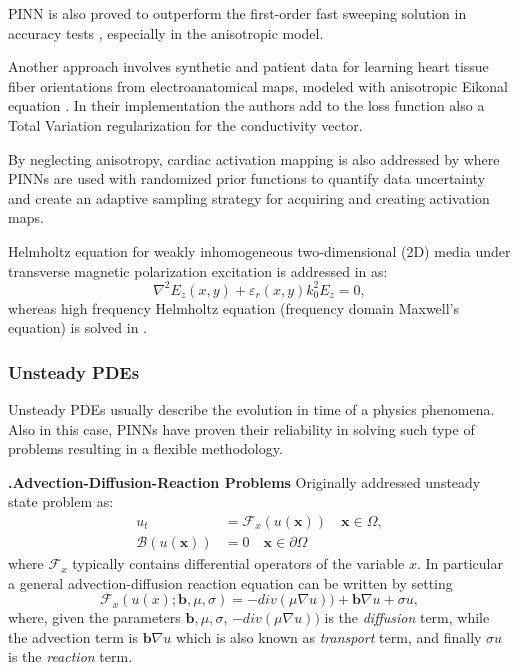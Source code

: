 \documentclass[pdflatex,sn-basic]{sn-jnl}%
\theoremstyle{thmstyleone}%
\theoremstyle{thmstyletwo}%
\theoremstyle{thmstylethree}%
\newcounter{paranum}[subsubsection]
\newcommand{\subsubsubsection}{\vspace{10pt}\noindent\textbf{\thesubsubsection.\refstepcounter{paranum}\theparanum\;}\textbf}
\begin{document}
PINN is also proved to outperform the first-order fast sweeping solution in accuracy tests \citep{Wah2021_PinneikEikonalSolution_HagWHA}, especially in the anisotropic model.

Another approach involves synthetic and patient data for learning heart tissue fiber orientations from electroanatomical maps, modeled with anisotropic Eikonal equation \citep{Gra2021_LearningAtrialFiber_PezGPC}. In their implementation the authors add to the loss function also a Total Variation regularization for the conductivity vector.

By neglecting anisotropy, cardiac activation mapping is also addressed by \cite{Sah2020_PhysicsInformedNeural_YanSCYP} where PINNs are used with randomized prior functions to quantify data uncertainty and create an adaptive sampling strategy for acquiring and creating activation maps.

Helmholtz equation for weakly inhomogeneous two-dimensional (2D) media under transverse magnetic polarization excitation
 is addressed in \cite{Che2020_PhysicsInformedNeural_LuCLK} as:
\begin{equation*}
\nabla^{2}{E_z\left(x,y\right)}+{\varepsilon_{r}}\left(x,y\right)k_{0}^{2}E_{z}=0,
\end{equation*}
whereas high frequency Helmholtz equation (frequency domain Maxwell’s equation) is solved in \cite{Fan2020_DeepPhysicalInformed_ZhaFZ}.

\subsubsection{Unsteady PDEs}
Unsteady PDEs usually describe the evolution in time of a physics phenomena. Also in this case, PINNs have proven their reliability in solving such type of problems resulting in a flexible methodology. 

\subsubsubsection{Advection-Diffusion-Reaction Problems}
Originally \cite{Rai2019_PhysicsInformedNeural_PerRPK} addressed unsteady state problem as:%
\begin{align*}
u_t &= \mathcal{F}_x(u(\bm{x})) \quad \bm{x}\in \Omega ,
 \\
\mathcal{B}(u(\bm{x})) &= 0  \quad \bm{x}\in \partial \Omega
\end{align*}
where $\mathcal{F}_x$  typically contains differential operators of the variable $x$.
In particular a general advection-diffusion reaction  equation can be written by setting
\begin{equation*}
\mathcal{F}_x(u(x);  \bm{b},\mu, \sigma )  = - div(\mu \nabla u)) + \bm{b}\nabla u + \sigma u,
\end{equation*}
where, given the parameters $\bm{b},\mu, \sigma$,  $- div(\mu \nabla u))$ is the \emph{diffusion} term, while the advection term is $\bm{b}\nabla u$ which is also known as \emph{transport} term, and finally $\sigma u$ is the \emph{reaction} term.
\end{document}
